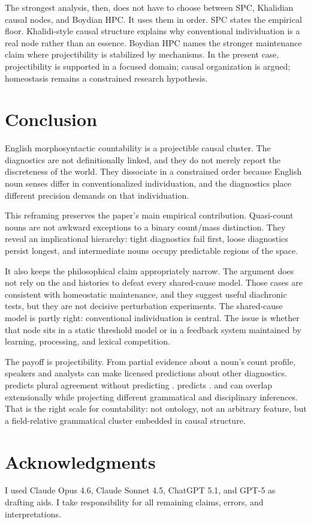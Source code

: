 \documentclass[12pt,a4paper]{article}
\begin{document}
The strongest analysis, then, does not have to choose between SPC, Khalidian causal nodes, and Boydian HPC. It uses them in order. SPC states the empirical floor. Khalidi-style causal structure explains why conventional individuation is a real node rather than an essence. Boydian HPC names the stronger maintenance claim where projectibility is stabilized by mechanisms. In the present case, projectibility is supported in a focused domain; causal organization is argued; homeostasis remains a constrained research hypothesis.

\section{Conclusion}\label{sec:conclusion-v3}

English morphosyntactic countability is a projectible causal cluster. The diagnostics are not definitionally linked, and they do not merely report the discreteness of the world. They dissociate in a constrained order because English noun senses differ in conventionalized individuation, and the diagnostics place different precision demands on that individuation.

This reframing preserves the paper's main empirical contribution. Quasi-count nouns are not awkward exceptions to a binary count/mass distinction. They reveal an implicational hierarchy: tight diagnostics fail first, loose diagnostics persist longest, and intermediate nouns occupy predictable regions of the space.

It also keeps the philosophical claim appropriately narrow. The argument does not rely on the  and  histories to defeat every shared-cause model. Those cases are consistent with homeostatic maintenance, and they suggest useful diachronic tests, but they are not decisive perturbation experiments. The shared-cause model is partly right: conventional individuation is central. The issue is whether that node sits in a static threshold model or in a feedback system maintained by learning, processing, and lexical competition.

The payoff is projectibility. From partial evidence about a noun's count profile, speakers and analysts can make licensed predictions about other diagnostics.  predicts plural agreement without predicting .  predicts .  and  can overlap extensionally while projecting different grammatical and disciplinary inferences. That is the right scale for countability: not ontology, not an arbitrary feature, but a field-relative grammatical cluster embedded in causal structure.

\section*{Acknowledgments}

I used Claude Opus 4.6, Claude Sonnet 4.5, ChatGPT 5.1, and GPT-5 as drafting aids. I take responsibility for all remaining claims, errors, and interpretations.

\newpage

\printbibliography
\end{document}
